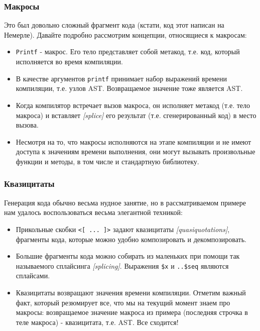 \documentclass[hyperref={bookmarks=false}]{beamer}
\begin{document}
\begin{frame}[t]
\frametitle{Макросы}

Это был довольно сложный фрагмент кода (кстати, код этот написан на Немерле). Давайте подробно рассмотрим концепции, относящиеся к макросам:

\begin{itemize}
\item \texttt{Printf} - макрос. Его тело представляет собой метакод, т.е. код, который исполняется во время компиляции.
\item В качестве аргументов \texttt{printf} принимает набор выражений времени компиляции, т.е. узлов AST. Возвращаемое значение тоже является AST.
\item Когда компилятор встречает вызов макроса, он исполняет метакод (т.е. тело макроса) и вставляет \emph{[splice]} его результат (т.е. сгенерированный код) в место вызова.
\item Несмотря на то, что макросы исполняются на этапе компиляции и не имеют доступа к значениям времени выполнения, они могут вызывать произвольные функции и методы, в том числе и стандартную библиотеку.
\end{itemize}
\end{frame}

\begin{frame}[t]
\frametitle{Квазицитаты}

Генерация кода обычно весьма нудное занятие, но в рассматриваемом примере нам удалось воспользоваться весьма элегантной техникой:

\begin{itemize}
\item Прикольные скобки \texttt{<[ ... ]>} задают квазицитаты \emph{[quasiquotations]}, фрагменты кода, которые можно удобно композировать и декомпозировать.
\item Большие фрагменты кода можно собирать из маленьких при помощи так называемого сплайсинга \emph{[splicing]}. Выражения \texttt{\$x} и \texttt{..\$seq} являются сплайсами.
\item Квазицитаты возвращают значения времени компиляции. Отметим важный факт, который резюмирует все, что мы на текущий момент знаем про макросы: возвращаемое значение макроса из примера (последняя строчка в теле макроса) - квазицитата, т.е. AST. Все сходится!
\end{itemize}
\end{frame}
\end{document}
